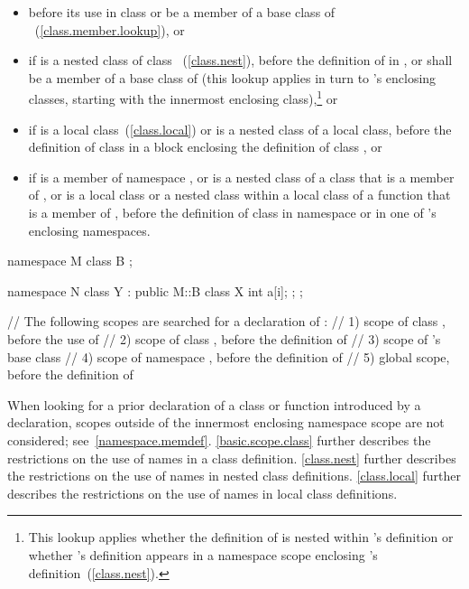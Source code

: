 \begin{itemize}
\item before its use in class  or be a member of a base class
of ~(\ref{class.member.lookup}), or
\item if  is a nested class of class
~(\ref{class.nest}), before the definition of  in
, or shall be a member of a base class of  (this
lookup applies in turn to  's enclosing classes, starting with
the innermost enclosing class),\footnote{This lookup applies whether the
definition of  is
nested within 's definition or whether 's definition
appears in a namespace scope enclosing  's
definition~(\ref{class.nest}).}
or
\item if  is a local class~(\ref{class.local}) or is a nested
class of a local class, before the definition of class  in a
block enclosing the definition of class , or
\item if  is a member of namespace , or is a nested
class of a class that is a member of , or is a local class or a
nested class within a local class of a function that is a member of
, before the definition of class  in namespace
 or in one of  's enclosing namespaces.
\end{itemize}

\enterexample 

\begin{codeblock}
namespace M {
  class B { };
}

\end{codeblock}
\begin{codeblock}
namespace N {
  class Y : public M::B {
    class X {
      int a[i];
    };
  };
}

// The following scopes are searched for a declaration of :
// 1) scope of class , before the use of 
// 2) scope of class , before the definition of 
// 3) scope of 's base class 
// 4) scope of namespace , before the definition of 
// 5) global scope, before the definition of 
\end{codeblock}

\exitexample \enternote When looking for a prior declaration of a class
or function introduced by a  declaration, scopes outside
of the innermost enclosing namespace scope are not considered;
see~\ref{namespace.memdef}. \exitnote \enternote \ref{basic.scope.class}
further describes the restrictions on the use of names in a class
definition. \ref{class.nest} further describes the restrictions on the
use of names in nested class definitions. \ref{class.local} further
describes the restrictions on the use of names in local class
definitions. \exitnote

